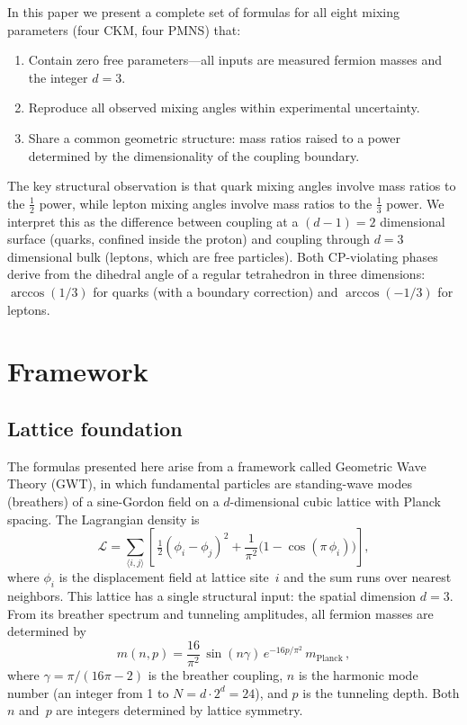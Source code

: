 \documentclass[12pt,a4paper]{article}
\begin{document}
In this paper we present a complete set of formulas for all eight mixing parameters (four CKM, four PMNS) that:
\begin{enumerate}[nosep]
  \item Contain zero free parameters---all inputs are measured fermion masses and the integer $d=3$.
  \item Reproduce all observed mixing angles within experimental uncertainty.
  \item Share a common geometric structure: mass ratios raised to a power determined by the dimensionality of the coupling boundary.
\end{enumerate}

The key structural observation is that quark mixing angles involve mass ratios to the $\tfrac{1}{2}$ power, while lepton mixing angles involve mass ratios to the $\tfrac{1}{3}$ power. We interpret this as the difference between coupling at a $(d{-}1)=2$ dimensional surface (quarks, confined inside the proton) and coupling through $d=3$ dimensional bulk (leptons, which are free particles). Both CP-violating phases derive from the dihedral angle of a regular tetrahedron in three dimensions: $\arccos(1/3)$ for quarks (with a boundary correction) and $\arccos(-1/3)$ for leptons.

\section{Framework}

\subsection{Lattice foundation}

The formulas presented here arise from a framework called Geometric Wave Theory (GWT), in which fundamental particles are standing-wave modes (breathers) of a sine-Gordon field on a $d$-dimensional cubic lattice with Planck spacing. The Lagrangian density is
\begin{equation}
  \mathcal{L} = \sum_{\langle i,j\rangle}\left[\,\tfrac{1}{2}(\phi_i-\phi_j)^2
    + \frac{1}{\pi^2}\bigl(1-\cos(\pi\,\phi_i)\bigr)\right],
  \label{eq:lagrangian}
\end{equation}
where $\phi_i$ is the displacement field at lattice site~$i$ and the sum runs over nearest neighbors. This lattice has a single structural input: the spatial dimension $d=3$. From its breather spectrum and tunneling amplitudes, all fermion masses are determined by
\begin{equation}
  m(n,p) = \frac{16}{\pi^2}\,\sin(n\gamma)\,e^{-16p/\pi^2}\,m_{\mathrm{Planck}}\,,
  \label{eq:mass}
\end{equation}
where $\gamma=\pi/(16\pi-2)$ is the breather coupling, $n$ is the harmonic mode number (an integer from 1 to $N=d\cdot 2^d=24$), and $p$ is the tunneling depth. Both $n$ and~$p$ are integers determined by lattice symmetry.
\end{document}
